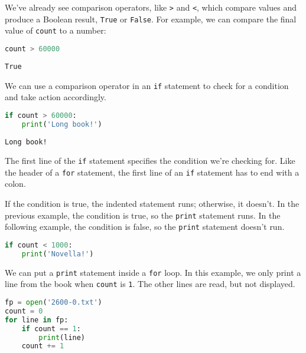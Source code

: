 We've already see comparison operators, like \passthrough{\lstinline!>!}
and \passthrough{\lstinline!<!}, which compare values and produce a
Boolean result, \passthrough{\lstinline!True!} or
\passthrough{\lstinline!False!}. For example, we can compare the final
value of \passthrough{\lstinline!count!} to a number:

\begin{lstlisting}[language=Python,style=source]
count > 60000
\end{lstlisting}

\begin{lstlisting}[style=output]
True
\end{lstlisting}

We can use a comparison operator in an \passthrough{\lstinline!if!}
statement to check for a condition and take action accordingly.

\begin{lstlisting}[language=Python,style=source]
if count > 60000:
    print('Long book!')
\end{lstlisting}

\begin{lstlisting}[style=output]
Long book!
\end{lstlisting}

The first line of the \passthrough{\lstinline!if!} statement specifies
the condition we're checking for. Like the header of a
\passthrough{\lstinline!for!} statement, the first line of an
\passthrough{\lstinline!if!} statement has to end with a colon.

If the condition is true, the indented statement runs; otherwise, it
doesn't. In the previous example, the condition is true, so the
\passthrough{\lstinline!print!} statement runs. In the following
example, the condition is false, so the \passthrough{\lstinline!print!}
statement doesn't run.

\begin{lstlisting}[language=Python,style=source]
if count < 1000:
    print('Novella!')
\end{lstlisting}

We can put a \passthrough{\lstinline!print!} statement inside a
\passthrough{\lstinline!for!} loop. In this example, we only print a
line from the book when \passthrough{\lstinline!count!} is
\passthrough{\lstinline!1!}. The other lines are read, but not
displayed.

\begin{lstlisting}[language=Python,style=source]
fp = open('2600-0.txt')
count = 0
for line in fp:
    if count == 1:
        print(line)
    count += 1
\end{lstlisting}

